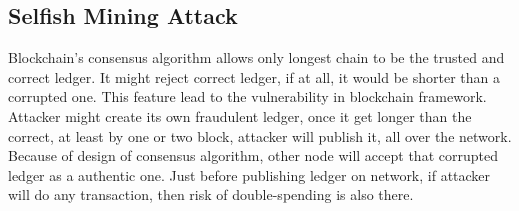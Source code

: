 \documentclass[a4paper,twoside,12pt]{report}
\begin{document}
\begin{spacing}{1.5}
\subsection{Selfish Mining Attack}
Blockchain's consensus algorithm allows only longest chain to be the trusted and correct ledger. It might reject correct ledger, if at all, it would be shorter than a corrupted one. This feature lead to the vulnerability in blockchain framework. Attacker might create its own fraudulent ledger, once it get longer than the correct, at least by one or two block, attacker will publish it, all over the network. Because of design of consensus algorithm, other node will accept that corrupted ledger as a authentic one. Just before publishing ledger on network, if attacker will do any transaction, then risk of double-spending is also there.

\end{spacing}
\end{document}
